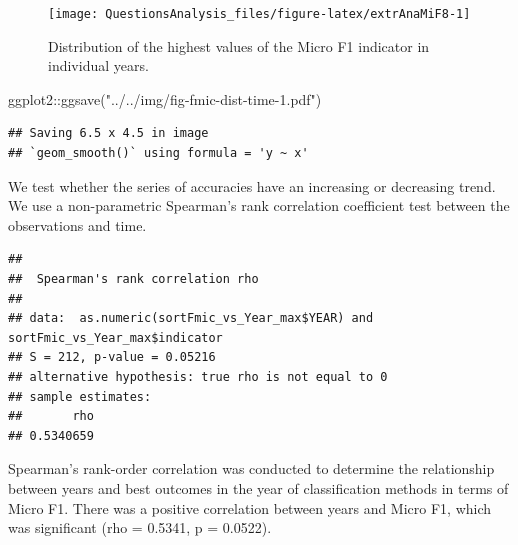 \documentclass[
]{article}
\newenvironment{Shaded}{\begin{snugshade}}{\end{snugshade}}
\newcommand{\AttributeTok}[1]{\textcolor[rgb]{0.77,0.63,0.00}{#1}}
\newcommand{\FunctionTok}[1]{\textcolor[rgb]{0.00,0.00,0.00}{#1}}
\newcommand{\NormalTok}[1]{#1}
\newcommand{\OtherTok}[1]{\textcolor[rgb]{0.56,0.35,0.01}{#1}}
\newcommand{\SpecialCharTok}[1]{\textcolor[rgb]{0.00,0.00,0.00}{#1}}
\newcommand{\StringTok}[1]{\textcolor[rgb]{0.31,0.60,0.02}{#1}}
\begin{document}
\begin{figure}

{\centering \texttt{[image: QuestionsAnalysis\_files/figure-latex/extrAnaMiF8-1]} 

}

\caption{Distribution of the highest values of the Micro F1 indicator in individual years.}\label{fig:extrAnaMiF8}
\end{figure}

\begin{Shaded}
\begin{Highlighting}[]
\NormalTok{ggplot2}\SpecialCharTok{::}\FunctionTok{ggsave}\NormalTok{(}\StringTok{"../../img/fig{-}fmic{-}dist{-}time{-}1.pdf"}\NormalTok{)}
\end{Highlighting}
\end{Shaded}

\begin{verbatim}
## Saving 6.5 x 4.5 in image
## `geom_smooth()` using formula = 'y ~ x'
\end{verbatim}

We test whether the series of accuracies have an increasing or decreasing trend. We use a non-parametric Spearman's rank correlation coefficient test between the observations and time.

\begin{Shaded}
\end{Shaded}

\begin{verbatim}
## 
##  Spearman's rank correlation rho
## 
## data:  as.numeric(sortFmic_vs_Year_max$YEAR) and sortFmic_vs_Year_max$indicator
## S = 212, p-value = 0.05216
## alternative hypothesis: true rho is not equal to 0
## sample estimates:
##       rho 
## 0.5340659
\end{verbatim}

Spearman's rank-order correlation was conducted to determine the relationship between years and best outcomes in the year of classification methods in terms of Micro F1. There was a positive correlation between years and Micro F1, which was significant (rho = 0.5341, p = 0.0522).
\end{document}
